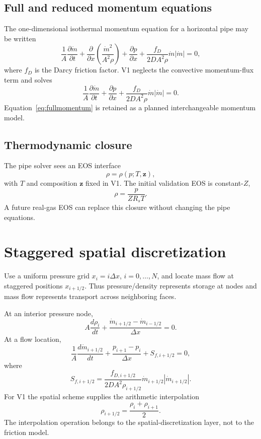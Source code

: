 \documentclass[11pt]{article}
\newcommand{\mdot}{\dot m}
\begin{document}
\subsection{Full and reduced momentum equations}
The one-dimensional isothermal momentum equation for a horizontal pipe may be written
\begin{equation}
\frac{1}{A}\frac{\partial\mdot}{\partial t}
+\frac{\partial}{\partial x}\left(\frac{\mdot^2}{A^2\rho}\right)
+\frac{\partial p}{\partial x}
+\frac{f_D}{2DA^2\rho}\mdot|\mdot|=0,
\label{eq:fullmomentum}
\end{equation}
where $f_D$ is the Darcy friction factor. V1 neglects the convective momentum-flux term and solves
\begin{equation}
\boxed{
\frac{1}{A}\frac{\partial\mdot}{\partial t}
+\frac{\partial p}{\partial x}
+\frac{f_D}{2DA^2\rho}\mdot|\mdot|=0.}
\label{eq:reducedmomentum}
\end{equation}
Equation~\eqref{eq:fullmomentum} is retained as a planned interchangeable momentum model.

\subsection{Thermodynamic closure}
The pipe solver sees an EOS interface
\begin{equation}
\rho=\rho(p;T,\bm z),
\end{equation}
with $T$ and composition $\bm z$ fixed in V1. The initial validation EOS is constant-$Z$,
\begin{equation}
\rho=\frac{p}{ZR_sT}.
\label{eq:constz}
\end{equation}
A future real-gas EOS can replace this closure without changing the pipe equations.

\section{Staggered spatial discretization}
Use a uniform pressure grid $x_i=i\Delta x$, $i=0,\ldots,N$, and locate mass flow at staggered positions $x_{i+1/2}$. Thus pressure/density represents storage at nodes and mass flow represents transport across neighboring faces.

At an interior pressure node,
\begin{equation}
A\frac{d\rho_i}{dt}
+\frac{\mdot_{i+1/2}-\mdot_{i-1/2}}{\Delta x}=0.
\label{eq:semimass}
\end{equation}
At a flow location,
\begin{equation}
\frac{1}{A}\frac{d\mdot_{i+1/2}}{dt}
+\frac{p_{i+1}-p_i}{\Delta x}
+S_{f,i+1/2}=0,
\label{eq:semimomentum}
\end{equation}
where
\begin{equation}
S_{f,i+1/2}=\frac{f_{D,i+1/2}}{2DA^2\rho_{i+1/2}}
\mdot_{i+1/2}|\mdot_{i+1/2}|.
\end{equation}
For V1 the spatial scheme supplies the arithmetic interpolation
\begin{equation}
\rho_{i+1/2}=\frac{\rho_i+\rho_{i+1}}{2}.
\label{eq:face_density}
\end{equation}
The interpolation operation belongs to the spatial-discretization layer, not to the friction model.
\end{document}
